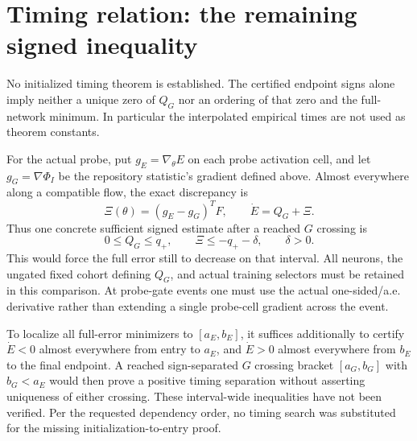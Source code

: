 \section{Timing relation: the remaining signed inequality}
No initialized timing theorem is established. The certified endpoint signs
alone imply neither a unique zero of $Q_G$ nor an ordering of that zero and
the full-network minimum. In particular the interpolated empirical times
are not used as theorem constants.

For the actual probe, put $g_E=\nabla_\theta E$ on each probe activation cell,
and let $g_G=\nabla\Phi_I$ be the repository statistic's gradient defined
above. Almost everywhere along a compatible flow, the exact discrepancy is
\[
 \Xi(\theta)=(g_E-g_G)^TF,\qquad \dot E=Q_G+\Xi.
\]
Thus one concrete sufficient signed estimate after a reached $G$ crossing is
\begin{equation}\label{initcert:timing-missing}
 0\le Q_G\le q_+,
 \qquad \Xi\le-q_+-\delta,\qquad \delta>0.
\end{equation}
This would force the full error still to decrease on that interval. All
neurons, the ungated fixed cohort defining $Q_G$, and actual training
selectors must be retained in this comparison. At probe-gate events one
must use the actual one-sided/a.e. derivative rather than extending a
single probe-cell gradient across the event.

To localize all full-error minimizers to $[a_E,b_E]$, it suffices additionally
to certify $\dot E<0$ almost everywhere from entry to $a_E$, and
$\dot E>0$ almost everywhere from $b_E$ to the final endpoint. A reached
sign-separated $G$ crossing bracket $[a_G,b_G]$ with $b_G<a_E$ would then
prove a positive timing separation without asserting uniqueness of either
crossing. These interval-wide inequalities have not been verified.
Per the requested dependency order, no timing search was substituted for
the missing initialization-to-entry proof.

